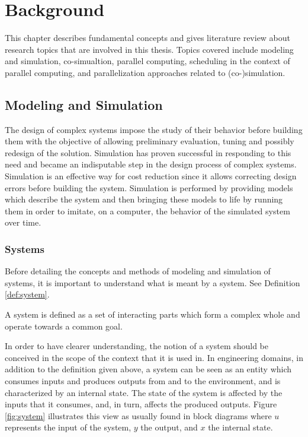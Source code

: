 \chapter{\label{ch:2-bkgnd}Background}

\minitoc

This chapter describes fundamental concepts and gives literature review about research topics that are involved in this thesis. Topics covered include modeling and simulation, co-simualtion, parallel computing, scheduling in the context of parallel computing, and parallelization approaches related to (co-)simulation. 

\section{\label{sec:MnS}Modeling and Simulation}

The design of complex systems impose the study of their behavior before building them with the objective of allowing preliminary evaluation, tuning and possibly redesign of the solution. Simulation has proven successful in responding to this need and became an indisputable step in the design process of complex systems. Simulation is an effective way for cost reduction since it allows correcting design errors before building the system. Simulation is performed by providing models which describe the system and then bringing these models to life by running them in order to imitate, on a computer, the behavior of the simulated system over time.   

\subsection{Systems}

Before detailing the concepts and methods of modeling and simulation of systems, it is important to understand what is meant by a system. See Definition \ref{def:system}.

\begin{definition}
A system is defined as a set of interacting parts which form a complex whole and operate towards a common goal.
\label{def:system}
\end{definition}

In order to have clearer understanding, the notion of a system should be conceived in the scope of the context that it is used in. In engineering domains, in addition to the definition given above, a system can be seen as an entity which consumes inputs and produces outputs from and to the environment, and is characterized by an internal state. The state of the system is affected by the inputs that it consumes, and, in turn, affects the produced outputs. Figure \ref{fig:system} illustrates this view as usually found in block diagrams where $u$ represents the input of the system, $y$ the output, and $x$ the internal state.

